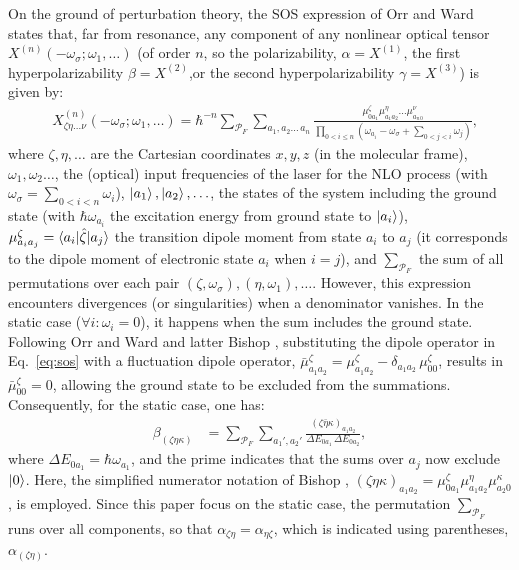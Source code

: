 \documentclass[USenglish]{article}
\begin{document}
On the ground of perturbation theory, 
the SOS expression of Orr and Ward \cite{orrPerturbationTheoryNonlinear1971} states that, far from resonance, any component of any nonlinear optical tensor $X^{(n)}(-\omega_\sigma;\omega_1,\ldots)$ (of order $n$, so the polarizability, $\alpha = X^{(1)}$, the first hyperpolarizability $\beta = X^{(2)}$,or the second hyperpolarizability $\gamma = X^{(3)}$) is given by:\begin{align}
	&X^{(n)}_{\zeta\eta\ldots\nu}(-\omega_\sigma;\omega_1,\ldots) = \hbar^{-n}\sum_{\mathcal{P}_F}\sum_{a_1,a_2\ldots\,a_{n}} \frac{\mu^\zeta_{0a_1}{\mu}^\eta_{a_1a_2}\ldots \mu^\nu_{a_{n\,0}}}{\prod_{0<i\leq n} (\omega_{a_i}-\omega_\sigma+\sum_{0<j<i} \omega_j)},\label{eq:sos}
\end{align}
where $\zeta,\eta,\ldots$ are the Cartesian coordinates $x, y, z$ (in the molecular frame), $\omega_1, \omega_2\ldots$, the (optical) input frequencies of the laser for the NLO process (with $\omega_\sigma = \sum_{0<i<n} \omega_i$), $\ket{a_1}, \ket{a_2}, \ldots$, the states of the system  including the ground state (with $\hbar\omega_{a_i}$ the excitation energy from ground state to $\ket{a_i}$), $\mu^\zeta_{a_ia_j} = \braket{a_i|\hat \zeta|a_j}$ the transition dipole moment from state $a_i$ to $a_j$ (it corresponds to the dipole moment of electronic state $a_i$ when $i=j$), and $\sum_{\mathcal{P}_F}$ the sum of all permutations over each pair $(\zeta, \omega_\sigma),(\eta,\omega_1),\ldots$.  However, this expression encounters divergences (or singularities) when a denominator vanishes. In the static case ($\forall i: \omega_i = 0$), it happens when the sum includes the ground state. Following Orr and Ward \cite{orrPerturbationTheoryNonlinear1971} and latter Bishop \cite{bishopExplicitNondivergentFormulas1994}, substituting the dipole operator in Eq.~\eqref{eq:sos} with a fluctuation dipole operator, $\bar{\mu}^\zeta_{a_1 a_2} = \mu^\zeta_{a_1 a_2} - \delta_{a_1 a_2}\, \mu_{00}^\zeta$, results in $\bar{\mu}^\zeta_{00} = 0$, allowing the ground state to be excluded from the summations. Consequently, for the static case, one has:
\begin{align}
	\beta_{(\zeta\eta\kappa)} &=\sum_{\mathcal{P}_F} \sum_{a_1', a_2'} \frac{(\zeta\bar{\eta}\kappa)_{a_1 a_2}}{\Delta E_{0a_1}\,\Delta E_{0a_2}}, \label{eq:sosbeta}
\end{align}
where $\Delta E_{0a_1} = \hbar\omega_{a_1}$, and the prime indicates that the sums over $a_j$ now exclude $\ket{0}$.  Here, the simplified numerator notation of Bishop \cite{bishopExplicitNondivergentFormulas1994}, $(\zeta\eta\kappa)_{a_1 a_2} = \mu_{0 a_1}^\zeta \mu_{a_1 a_2}^\eta \mu_{a_2 0}^\kappa$, is employed. Since this paper focus on the static case, the permutation $\sum_{\mathcal P_F}$ runs over all components, so that $\alpha_{\zeta\eta} = \alpha_{\eta\zeta}$, which is indicated using parentheses, $\alpha_{(\zeta\eta)}$.
\end{document}
